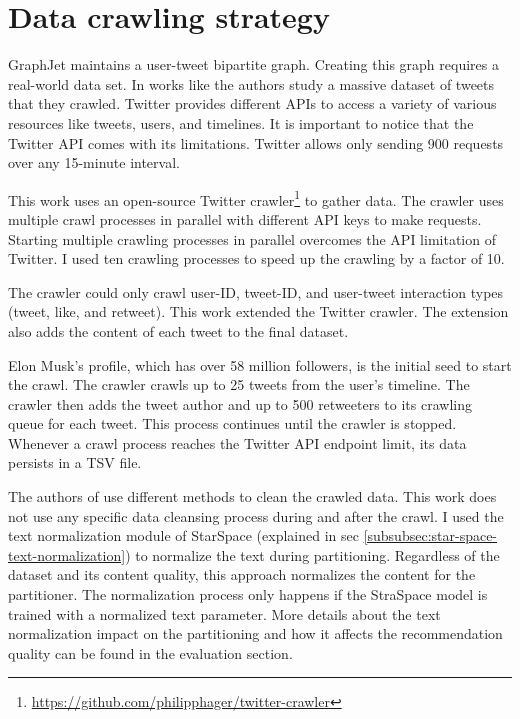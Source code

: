 \section{Data crawling strategy}
\label{sec:data-crawling-strategy}

GraphJet maintains a user-tweet bipartite graph. Creating this graph requires a real-world data set. In works like \cite{kwakWhatTwitterSocial2010} the authors study a massive dataset of tweets that they crawled. Twitter provides different APIs to access a variety of various resources like tweets, users, and timelines. It is important to notice that the Twitter API comes with its limitations. Twitter allows only sending 900 requests over any 15-minute interval. 


This work uses an open-source Twitter crawler\footnote{\url{https://github.com/philipphager/twitter-crawler}} to gather data. The crawler uses multiple crawl processes in parallel with different API keys to make requests. Starting multiple crawling processes in parallel overcomes the API limitation of Twitter. I used ten crawling processes to speed up the crawling by a factor of 10. 


The crawler could only crawl user-ID, tweet-ID, and user-tweet interaction types (tweet, like, and retweet). This work extended the Twitter crawler. The extension also adds the content of each tweet to the final dataset. 


Elon Musk's profile, which has over 58 million followers, is the initial seed to start the crawl. The crawler crawls up to 25 tweets from the user's timeline. The crawler then adds the tweet author and up to 500 retweeters to its crawling queue for each tweet. This process continues until the crawler is stopped. Whenever a crawl process reaches the Twitter API endpoint limit, its data persists in a TSV file.


The authors of \cite{kwakWhatTwitterSocial2010} use different methods to clean the crawled data. This work does not use any specific data cleansing process during and after the crawl. I used the text normalization module of StarSpace (explained in sec \ref{subsubsec:star-space-text-normalization}) to normalize the text during partitioning. Regardless of the dataset and its content quality, this approach normalizes the content for the partitioner. The normalization process only happens if the StraSpace model is trained with a normalized text parameter. More details about the text normalization impact on the partitioning and how it affects the recommendation quality can be found in the evaluation section.


